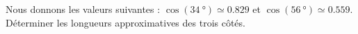 
\begin{exercice}\label{exo2smath-0246}

    Nous donnons les valeurs suivantes : \( \cos(\SI{34}{\degree})\simeq 0.829\) et \( \cos(\SI{56}{\degree})\simeq 0.559\). Déterminer les longueurs approximatives des trois côtés. 

\begin{center}

\end{center}

\end{exercice}
